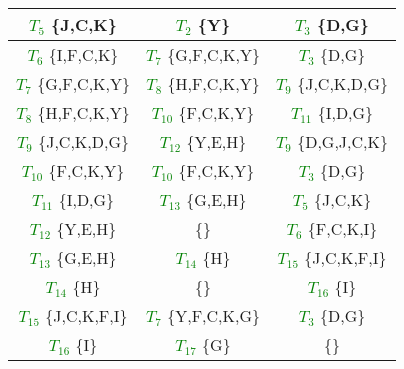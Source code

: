 \begin{itemize}
\begin{table}[H]
\begin{tabular}{|c|c|c|}
			\textcolor{green}{$T_{5}$} \{J,C,K\} & \textcolor{green}{$T_{2}$} \{Y\} &
			\textcolor{green}{$T_{3}$} \{D,G\} \\\hline
			
			\textcolor{green}{$T_{6}$} \{I,F,C,K\} & \textcolor{green}{$T_{7}$} \{G,F,C,K,Y\} &
			\textcolor{green}{$T_{3}$} \{D,G\} \\\hline
			
			\textcolor{green}{$T_{7}$} \{G,F,C,K,Y\} & \textcolor{green}{$T_{8}$} \{H,F,C,K,Y\} &
			\textcolor{green}{$T_{9}$} \{J,C,K,D,G\} \\\hline
			
			\textcolor{green}{$T_{8}$} \{H,F,C,K,Y\} & \textcolor{green}{$T_{10}$} \{F,C,K,Y\} &
			\textcolor{green}{$T_{11}$} \{I,D,G\} \\\hline
			
			\textcolor{green}{$T_{9}$} \{J,C,K,D,G\} & \textcolor{green}{$T_{12}$} \{Y,E,H\} &
			\textcolor{green}{$T_{9}$} \{D,G,J,C,K\} \\\hline
			
			\textcolor{green}{$T_{10}$} \{F,C,K,Y\} & \textcolor{green}{$T_{10}$} \{F,C,K,Y\} &
			\textcolor{green}{$T_{3}$} \{D,G\} \\\hline
			
			\textcolor{green}{$T_{11}$} \{I,D,G\} & \textcolor{green}{$T_{13}$} \{G,E,H\} &
			\textcolor{green}{$T_{5}$} \{J,C,K\} \\\hline
			
			\textcolor{green}{$T_{12}$} \{Y,E,H\} & \{\} &
			\textcolor{green}{$T_{6}$} \{F,C,K,I\} \\\hline
			
			\textcolor{green}{$T_{13}$} \{G,E,H\} & \textcolor{green}{$T_{14}$} \{H\} &
			\textcolor{green}{$T_{15}$} \{J,C,K,F,I\} \\\hline
			
			\textcolor{green}{$T_{14}$} \{H\} & \{\} &
			\textcolor{green}{$T_{16}$} \{I\} \\\hline
			
			\textcolor{green}{$T_{15}$} \{J,C,K,F,I\} & \textcolor{green}{$T_{7}$} \{Y,F,C,K,G\} &
			\textcolor{green}{$T_{3}$} \{D,G\} \\\hline
			
			\textcolor{green}{$T_{16}$} \{I\} & \textcolor{green}{$T_{17}$} \{G\} & \{\} \\\hline
			

\end{tabular}
\end{table}
\end{itemize}
